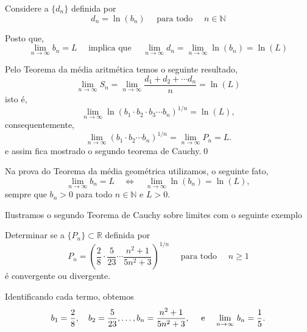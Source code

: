 \prova Considere a \seq  $\{d_n\}$ definida por
\begin{equation*}
    d_n=\ln(b_n)\quad \text{ para todo }\quad n\in \mathbb{N}
\end{equation*}

Posto que,
\begin{equation*}
    \lim_{n\to\infty}b_n=L\quad \text{ implica que }\quad \lim_{n\to\infty}d_n=\lim_{n\to\infty}\ln(b_n)=\ln(L)
\end{equation*}

Pelo Teorema da m\'{e}dia aritm\'{e}tica temos o seguinte resultado,
\begin{equation*}
    \lim_{n\to\infty}S_n=\lim_{n\to\infty}\frac{d_1+d_2+\cdots d_n}{n}=\ln(L)
\end{equation*}
isto \'{e},
\begin{equation*}
    \lim_{n\to\infty}\ln(b_1 \cdot b_2\cdot b_3\cdots b_n)^{1/n}=\ln(L),
\end{equation*}
consequentemente,
\begin{equation*}
    \lim_{n\to\infty}(b_1\cdot b_2\cdots b_n)^{1/n}=\lim_{n\to\infty}P_n=L.
\end{equation*}
e assim fica mostrado o segundo teorema de Cauchy.\qed

\begin{note}
Na prova do Teorema da m\'{e}dia geom\'{e}trica utilizamos, o seguinte fato,
\begin{equation*}
    \lim_{n\to\infty}b_n=L\quad \Leftrightarrow\quad \lim_{n\to\infty}\ln(b_n)=\ln(L),
\end{equation*}
sempre que $b_n>0$ para todo $n\in \mathbb{N}$ e $L>0$.
\end{note}

Ilustramos o segundo Teorema de Cauchy sobre limites com o seguinte exemplo

\begin{exer}
Determinar se a \seq $\{P_n\}\subset \mathbb{R}$ definida por
\begin{equation*}
P_n=\left(\frac{2}{8}\cdot\frac{5}{23}\cdots\frac{n^2+1}{5n^2+3}\right)^{1/n}\quad \text{ para todo }\quad n\geq 1
\end{equation*}
\'{e} convergente ou divergente.
\end{exer}

\solo Identificando cada termo,  obtemos
\begin{equation*}
b_1=\frac{2}{8},\quad b_2=\frac{5}{23},\ldots, b_n=\displaystyle{\frac{n^2+1}{5n^2+3}},\quad \text{ e }\quad \displaystyle{\lim_{n\to \infty}\,{b}_{n}}=\frac{1}{5}.
\end{equation*}

